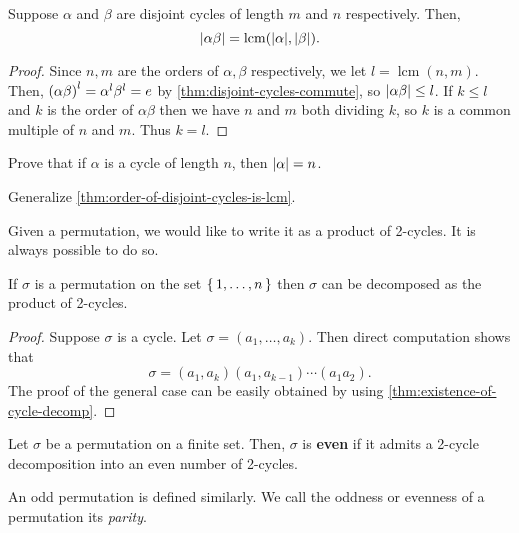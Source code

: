 \documentclass[./main.tex]{subfiles}
\begin{document}
\begin{theorem}
\label{thm:order-of-disjoint-cycles-is-lcm}
    Suppose $\alpha$ and $\beta$ are disjoint cycles of length $m$ and $n$
    respectively. Then, 
    \[
    \abs{\alpha \beta} = \operatorname{lcm}(\abs \alpha, \abs \beta).
    \]
\end{theorem}
\begin{proof}
    Since $n, m$ are the orders of $\alpha, \beta$ respectively, we let $l =
    \operatorname{lcm}(n, m)$. Then, $\paren{\alpha \beta}^{l} = \alpha^l
    \beta^l = e$ by \cref{thm:disjoint-cycles-commute}, so $\abs{\alpha \beta}
    \leq l$. If $k \leq l$ and $k$ is the order of $\alpha\beta$ then we have
    $n$ and $m$ both dividing $k$, so $k$ is a common multiple of $n$ and $m$.
    Thus $k = l$.
\end{proof}

\begin{exercise}
    Prove that if $\alpha$ is a cycle of length $n$, then $\abs{\alpha} = n$.
\end{exercise}
\begin{exercise}
    Generalize \cref{thm:order-of-disjoint-cycles-is-lcm}.
\end{exercise}

Given a permutation, we would like to write it as a product of 2-cycles.
It is always possible to do so.

\begin{proposition}
    If $\sigma$ is a permutation on the set $\set{1, \dots, n}$ then $\sigma$
    can be decomposed as the product of 2-cycles. 
\end{proposition}
\begin{proof}
    Suppose $\sigma$ is a cycle. Let $\sigma = (a_1, \dots, a_k)$. Then direct
    computation shows that
    \[
        \sigma = (a_1, a_k) (a_1, a_{k-1}) \cdots (a_1 a_2).
    \]
    The proof of the general case can be easily obtained by using
    \cref{thm:existence-of-cycle-decomp}.
\end{proof}

\begin{definition}
    \label{def:even-odd-permutation}
    Let $\sigma$ be a permutation on a finite set. Then, $\sigma$ is
    \textbf{even} if it admits a 2-cycle decomposition into an even number of
    2-cycles. 
\end{definition}
An odd permutation is defined similarly. We call the oddness or evenness of a
permutation its \emph{parity}.
\end{document}
